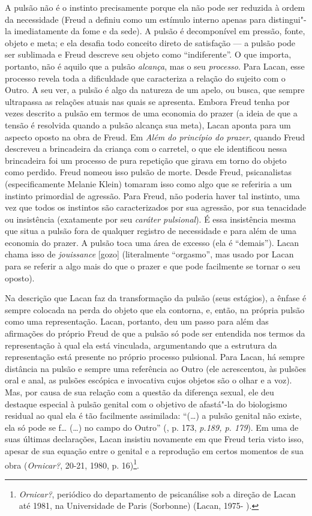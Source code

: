 A pulsão não é o instinto precisamente porque ela não pode ser reduzida
à ordem da necessidade (Freud a definiu como um estímulo interno apenas
para distingui"-la imediatamente da fome e da sede). A pulsão é
decomponível em pressão, fonte, objeto e meta; e ela desafia todo
conceito direto de satisfação --- a pulsão pode ser sublimada e Freud
descreve seu objeto como ``indiferente''. O que importa, portanto, não é
aquilo que a pulsão \emph{alcança}, mas o seu \emph{processo}. Para
Lacan, esse processo revela toda a dificuldade que caracteriza a relação
do sujeito com o Outro. A seu ver, a pulsão é algo da natureza de um
apelo, ou busca, que sempre ultrapassa as relações atuais nas quais se
apresenta. Embora Freud tenha por vezes descrito a pulsão em termos de
uma economia do prazer (a ideia de que a tensão é resolvida quando a
pulsão alcança sua meta), Lacan aponta para um aspecto oposto na obra de
Freud. Em \emph{Além do princípio do prazer}, quando Freud descreveu a
brincadeira da criança com o carretel, o que ele identificou nessa
brincadeira foi um processo de pura repetição que girava em torno do
objeto como perdido. Freud nomeou isso pulsão de morte. Desde Freud,
psicanalistas (especificamente Melanie Klein) tomaram isso como algo que
se referiria a um instinto primordial de agressão. Para Freud, não
poderia haver tal instinto, uma vez que todos os instintos são
caracterizados por sua agressão, por sua tenacidade ou insistência
(exatamente por seu \emph{caráter pulsional}). É essa insistência mesma
que situa a pulsão fora de qualquer registro de necessidade e para além
de uma economia do prazer. A pulsão toca uma área de excesso (ela é
``demais''). Lacan chama isso de \emph{jouissance} {[}gozo{]}
(literalmente ``orgasmo'', mas usado por Lacan para se referir a algo
mais do que o prazer e que pode facilmente se tornar o seu oposto).

Na descrição que Lacan faz da transformação da pulsão (seus estágios), a
ênfase é sempre colocada na perda do objeto que ela contorna, e, então,
na própria pulsão como uma representação. Lacan, portanto, deu um passo
para além das afirmações do próprio Freud de que a pulsão só pode ser
entendida nos termos da representação à qual ela está vinculada,
argumentando que a estrutura da representação está presente no próprio
processo pulsional. Para Lacan, há sempre distância na pulsão e sempre
uma referência ao Outro (ele acrescentou, às pulsões oral e anal, as
pulsões escópica e invocativa cujos objetos são o olhar e a voz). Mas,
por causa de sua relação com a questão da diferença sexual, ele deu
destaque especial à pulsão genital com o objetivo de afastá"-la do
biologismo residual ao qual ela é tão facilmente assimilada: ``(\ldots{}) a
pulsão genital não existe, ela só pode se f\ldots{} (\ldots{}) no campo do Outro''
(, p. 173, \emph{p.189, p. 179}). Em uma de suas últimas declarações,
Lacan insistiu novamente em que Freud teria visto isso, apesar de sua
equação entre o genital e a reprodução em certos momentos de sua obra
(\emph{Ornicar?}, 20-21, 1980, p. 16)\footnote{\emph{Ornicar?},
  periódico do departamento de psicanálise sob a direção de Lacan até
  1981, na Universidade de Paris  (Sorbonne) (Lacan, 1975- ).}.

